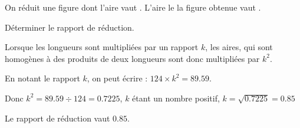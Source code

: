 \begin{exercice*}
    On réduit une figure dont l'aire vaut . L'aire le la figure obtenue vaut .

    \medskip
    Déterminer le rapport de réduction.

\end{exercice*}
\begin{corrige}
    Lorsque les longueurs sont multipliées par un rapport $k$, les aires, qui sont homogènes à 
    des produits de deux longueurs sont donc multipliées par $k^2$.

    En notant le rapport $k$, on peut écrire : $124\times k^2 = \num{89.59}$.

    Donc $k^2 = \num{89.59}\div 124 = \num{0.7225}$, $k$ étant un nombre positif, $k=\sqrt{\num{0.7225}} = \num{0.85}$

    \medskip
    Le rapport de réduction vaut $\num{0.85}$.
\end{corrige}

